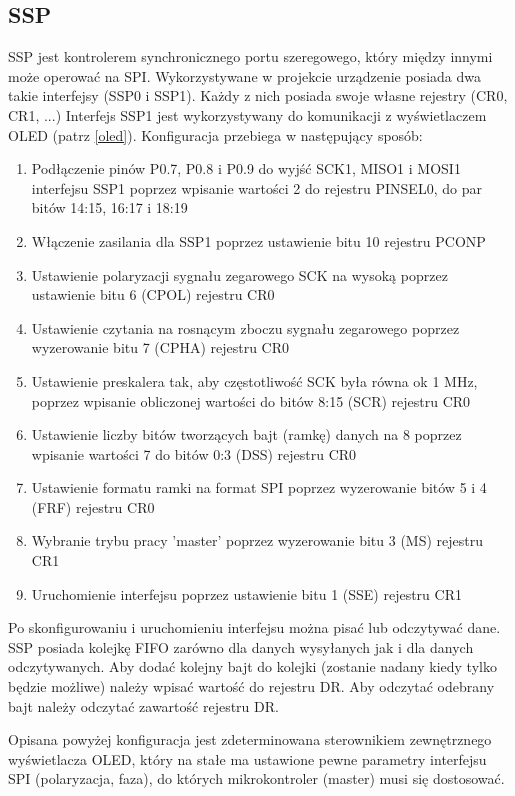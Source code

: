 \subsection{SSP} \label{ssp}
SSP jest kontrolerem synchronicznego portu szeregowego, który między innymi może operować na SPI. Wykorzystywane w projekcie urządzenie posiada dwa takie interfejsy (SSP0 i SSP1). Każdy z nich posiada swoje własne rejestry (CR0, CR1, ...) Interfejs SSP1 jest wykorzystywany do komunikacji z wyświetlaczem OLED (patrz \ref{oled}). Konfiguracja przebiega w następujący sposób:
\begin{enumerate}
    \item Podłączenie pinów P0.7, P0.8 i P0.9 do wyjść SCK1, MISO1 i MOSI1 interfejsu SSP1 poprzez wpisanie wartości 2 do rejestru PINSEL0, do par bitów 14:15, 16:17 i 18:19
    \item Włączenie zasilania dla SSP1 poprzez ustawienie bitu 10 rejestru PCONP
    \item Ustawienie polaryzacji sygnału zegarowego SCK na wysoką poprzez ustawienie bitu 6 (CPOL) rejestru CR0
    \item Ustawienie czytania na rosnącym zboczu sygnału zegarowego poprzez wyzerowanie bitu 7 (CPHA) rejestru CR0
    \item Ustawienie preskalera tak, aby częstotliwość SCK była równa ok 1 MHz, poprzez wpisanie obliczonej wartości do bitów 8:15 (SCR) rejestru CR0
    \item Ustawienie liczby bitów tworzących bajt (ramkę) danych na 8 poprzez wpisanie wartości 7 do bitów 0:3 (DSS) rejestru CR0
    \item Ustawienie formatu ramki na format SPI poprzez wyzerowanie bitów 5 i 4 (FRF) rejestru CR0
    \item Wybranie trybu pracy 'master' poprzez wyzerowanie bitu 3 (MS) rejestru CR1
    \item Uruchomienie interfejsu poprzez ustawienie bitu 1 (SSE) rejestru CR1
\end{enumerate}
Po skonfigurowaniu i uruchomieniu interfejsu można pisać lub odczytywać dane. SSP posiada kolejkę FIFO zarówno dla danych wysyłanych jak i dla danych odczytywanych. Aby dodać kolejny bajt do kolejki (zostanie nadany kiedy tylko będzie możliwe) należy wpisać wartość do rejestru DR. Aby odczytać odebrany bajt należy odczytać zawartość rejestru DR.

Opisana powyżej konfiguracja jest zdeterminowana sterownikiem zewnętrznego wyświetlacza OLED, który na stałe ma ustawione pewne parametry interfejsu SPI (polaryzacja, faza), do których mikrokontroler (master) musi się dostosować.
